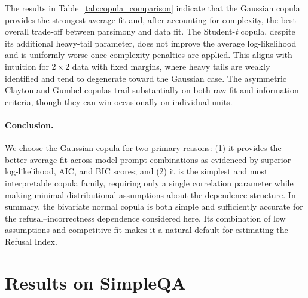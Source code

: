 \documentclass{article} %
\theoremstyle{definition}
\begin{document}
The results in Table~\ref{tab:copula_comparison} indicate that the Gaussian copula provides the strongest average fit and, after accounting for complexity, the best overall trade-off between parsimony and data fit. The Student-\emph{t} copula, despite its additional heavy-tail parameter, does not improve the average log-likelihood and is uniformly worse once complexity penalties are applied. This aligns with intuition for 2\,$\times$\,2 data with fixed margins, where heavy tails are weakly identified and tend to degenerate toward the Gaussian case. The asymmetric Clayton and Gumbel copulas trail substantially on both raw fit and information criteria, though they can win occasionally on individual units.

\paragraph{Conclusion.} We choose the Gaussian copula for two primary reasons: (1) it provides the better average fit across model-prompt combinations as evidenced by superior log-likelihood, AIC, and BIC scores; and (2) it is the simplest and most interpretable copula family, requiring only a single correlation parameter while making minimal distributional assumptions about the dependence structure.
In summary, the bivariate normal copula is both simple and sufficiently accurate for the refusal--incorrectness dependence considered here. Its combination of low assumptions and competitive fit makes it a natural default for estimating the Refusal Index.

\section{Results on SimpleQA}
\end{document}
